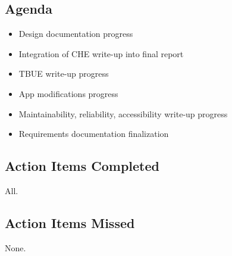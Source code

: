 \documentclass{article}
\begin{document}
\subsection*{Agenda}
\begin{itemize}
\item Design documentation progress
\item Integration of CHE write-up into final report
\item TBUE write-up progress
\item App modifications progress
\item Maintainability, reliability, accessibility write-up progress
\item Requirements documentation finalization
\end{itemize}

\subsection*{Action Items Completed}
All.

\subsection*{Action Items Missed}
None.
\end{document}
